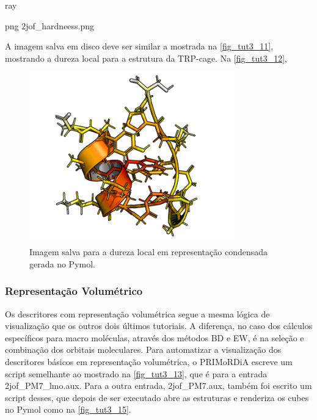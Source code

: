 \documentclass[a4paper,11pt]{refart}
\begin{document}
\hspace*{-\leftmarginwidth}
\begin{minipage}{\fullwidth}
	\begin{pymol}ray\end{pymol}
\end{minipage}

\hspace*{-\leftmarginwidth}
\begin{minipage}{\fullwidth}
	\begin{pymol}png 2jof_hardneess.png\end{pymol}
\end{minipage}

A imagem salva em disco deve ser similar a mostrada na \autoref{fig_tut3_11}, mostrando a dureza local para a estrutura da TRP-cage. Na \autoref{fig_tut3_12}, 

\hspace*{-\leftmarginwidth}
\begin{minipage}{\fullwidth}
	\begin{figure}[H]
		\begin{center}
			\includegraphics[width=3.5in]{images/tut3_img13}
			\caption{Imagem salva para a dureza local em representação condensada gerada no Pymol.}
			\label{fig_tut3_11}
		\end{center}
	\end{figure}
\end{minipage}


\subsubsection{Representação Volumétrico}


Os descritores com representação volumétrica segue a mesma lógica de visualização que os outros dois últimos tutoriais. A diferença, no caso dos cálculos específicos para macro moléculas, através dos métodos BD e EW, é na seleção e combinação dos orbitais moleculares. Para automatizar a visualização dos descritores básicos em representação volumétrica, o PRIMoRDiA escreve um script semelhante ao mostrado na \autoref{fig_tut3_13}, que é para a entrada 2jof\_PM7\_lmo.aux. Para a outra entrada, 2jof\_PM7.aux, também foi escrito um script desses, que  depois de ser executado abre as estruturas e renderiza os cubes no Pymol como na \autoref{fig_tut3_15}.
\end{document}
